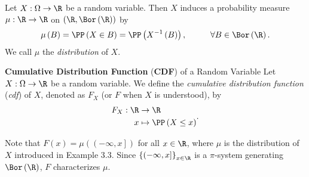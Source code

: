 \documentclass[stat901]{subfiles}
\begin{document}
    \rruleline

    \begin{example}{}
        Let $X:\Omega\to\R$ be a random variable. Then $X$ induces a probability measure $\mu:\R\to\R$ on $\left( \R,\Bor\left( \R \right) \right)$ by
        \begin{equation*}
            \mu\left( B \right) = \PP\left( X\in B \right) = \PP\left( X^{-1}\left( B \right) \right),\hspace{1cm}\forall B\in\Bor\left( \R \right).
        \end{equation*}
        We call $\mu$ the \emph{distribution} of $X$.
    \end{example}

    \rruleline

    \begin{definition}{\textbf{Cumulative Distribution Function} (\textbf{CDF}) of a Random Variable}
        Let $X:\Omega\to\R$ be a random variable. We define the \emph{cumulative distribution function} (\emph{cdf}) of $X$, denoted as $F_X$ (or $F$ when $X$ is understood), by
        \begin{equation*}
            \begin{aligned}
                F_X : \R&\to\R \\
                x&\mapsto\PP\left( X\leq x \right)
            \end{aligned} .
        \end{equation*}
    \end{definition}

    Note that $F\left( x \right) = \mu\left( \left( -\infty,x \right] \right)$ for all $x\in\R$, where $\mu$ is the distribution of $X$ introduced in Example 3.3. Since $\left\lbrace \left( -\infty,x \right] \right\rbrace^{}_{x\in\R}$ is a $\pi$-system generating $\Bor\left( \R \right)$, $F$ characterizes $\mu$.

    \clearpage
\end{document}

